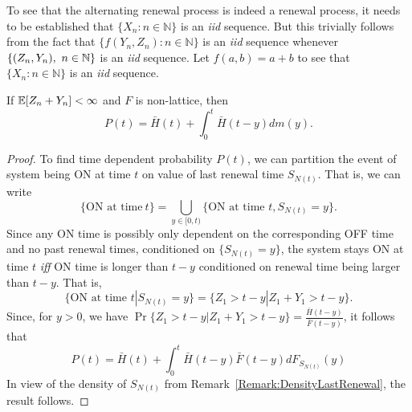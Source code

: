\documentclass[a4paper,10pt,english]{article}
\begin{document}
\begin{rem}
To see that the alternating renewal process is indeed a renewal process, it needs to be established that $\{X_n:n\in\mathbb{N}\}$ is an \emph{iid} sequence. But this trivially follows from the fact that $\{f(Y_n,Z_n):n\in\mathbb{N}\}$ is an \emph{iid} sequence whenever $\{(Z_n,Y_n),~n \in \mathbb{N}\}$ is an \emph{iid} sequence. Let $f(a,b) = a+b$ to see that $\{X_n:n\in\mathbb{N}\}$ is an \emph{iid} sequence.
\end{rem}

\begin{thm}[ON Probability] \label{Thm:OnProbability}
If $\mathbb{E}[Z_n+Y_n]< \infty $ and $F$ is non-lattice, then
\begin{equation*}
P(t) = \bar{H}(t)+\int_{0}^{t}\bar{H}(t-y)dm(y).
\end{equation*}
\end{thm} 
\begin{proof} To find time dependent probability $P(t)$, we can partition the event of system being ON at time $t$ on value of last renewal time $S_{N(t)}$. That is, we can write
\begin{equation*}
\{\text{ON at time}~ t\} =\bigcup_{y \in [0, t)}\{\text{ON at time } t, S_{N(t)} = y\}.%
\end{equation*}
Since any ON time is possibly only dependent on the corresponding OFF time and no past renewal times, conditioned on $\{S_{N(t)} = y \}$, the system stays ON at time $t$ \emph{iff} ON time is longer than $t-y$ conditioned on renewal time being larger than $t-y$. That is, 
\begin{equation*}
\{\text{ON at time } t| S_{N(t)} = y\} =\{Z_1 > t - y| Z_1 + Y_1 > t-y\}.
\end{equation*}
Since, for $y>0$, we have $\Pr\{Z_1 > t - y| Z_1 + Y_1 > t-y\} = \frac{\bar{H}(t-y)}{\bar{F}(t-y)}$, it follows that
\begin{equation*}
P(t) = \bar{H}(t)+ \int_{0}^t {\bar{H}(t-y)}{\bar{F}(t-y)}dF_{S_{N(t)}}(y)
\end{equation*}
In view of the density of $S_{N(t)}$ from Remark~\ref{Remark:DensityLastRenewal}, the result follows.
\end{proof}
\end{document}
